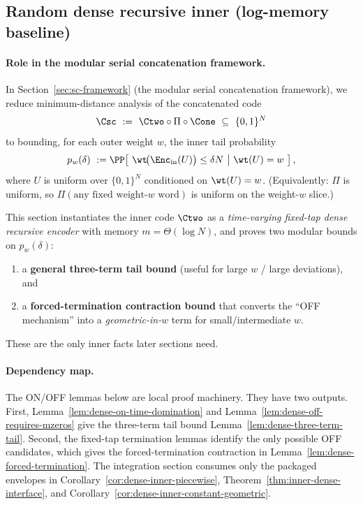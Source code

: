 \subsection{Random dense recursive inner (log-memory baseline)}
\label{sec:inner-dense}

\paragraph{Role in the modular serial concatenation framework.}
In Section~\ref{sec:sc-framework} (the modular serial concatenation framework),
we reduce minimum-distance analysis of the concatenated code
\[
\Csc \ :=\ \Ctwo \circ \Pi \circ \Cone \ \subseteq\ \{0,1\}^N
\]
to bounding, for each outer weight $w$, the inner tail probability
\[
p_w(\delta)\ :=
\PP\!\left[\ \wt\!\big(\Enc_{\mathrm{in}}(U)\big)\le \delta N \ \middle|\ \wt(U)=w\ \right],
\]
where $U$ is uniform over $\{0,1\}^N$ conditioned on $\wt(U)=w$.
(Equivalently: $\Pi$ is uniform, so $\Pi(\text{any fixed weight-}w\text{ word})$ is uniform on the weight-$w$ slice.)

This section instantiates the inner code $\Ctwo$ as a \emph{time-varying fixed-tap dense recursive
encoder} with memory $m=\Theta(\log N)$, and proves two modular bounds on $p_w(\delta)$:
\begin{enumerate}
\item a \textbf{general three-term tail bound} (useful for large $w$ / large deviations), and
\item a \textbf{forced-termination contraction bound} that converts the ``OFF mechanism'' into a \emph{geometric-in-$w$}
term for small/intermediate $w$.
\end{enumerate}
These are the only inner facts later sections need.

\paragraph{Dependency map.}
The ON/OFF lemmas below are local proof machinery.  They have two outputs.  First,
Lemma~\ref{lem:dense-on-time-domination} and
Lemma~\ref{lem:dense-off-requires-mzeros} give the three-term tail bound
Lemma~\ref{lem:dense-three-term-tail}.  Second, the fixed-tap termination
lemmas identify the only possible OFF candidates, which gives the
forced-termination contraction in Lemma~\ref{lem:dense-forced-termination}.
The integration section consumes only the packaged envelopes in
Corollary~\ref{cor:dense-inner-piecewise},
Theorem~\ref{thm:inner-dense-interface}, and
Corollary~\ref{cor:dense-inner-constant-geometric}.

